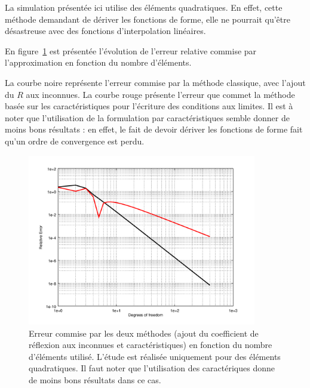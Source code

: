 La simulation présentée ici utilise des éléments quadratiques. En effet, cette méthode demandant de dériver les
fonctions de forme, elle ne pourrait qu'être désastreuse avec des fonctions d'interpolation linéaires.

En figure~\ref{fig:conv_DGMlike_quad} est présentée l'évolution de l'erreur relative commise par l'approximation en
fonction du nombre d'éléments.

La courbe noire représente l'erreur commise par la méthode classique, avec l'ajout du $R$ aux inconnues. La courbe rouge
présente l'erreur que commet la méthode basée sur les caractéristiques pour l'écriture des conditions aux limites. Il
est à noter que l'utilisation de la formulation par caractéristiques semble donner de moins bons résultats : en effet,
le fait de devoir dériver les fonctions de forme fait qu'un ordre de convergence est perdu.

\begin{figure}[!ht]
	\centering
	\includegraphics[width=10cm]{part3/figs/convergence.png}
	\caption{\label{fig:conv_DGMlike_quad}Erreur commise par les deux méthodes (ajout du coefficient de réflexion aux
	inconnues et caractéristiques) en fonction du nombre d'éléments utilisé. L'étude est réalisée uniquement pour des
	éléments quadratiques. Il faut noter que l'utilisation des caractériques donne de moins bons résultats dans ce cas.}
\end{figure}
